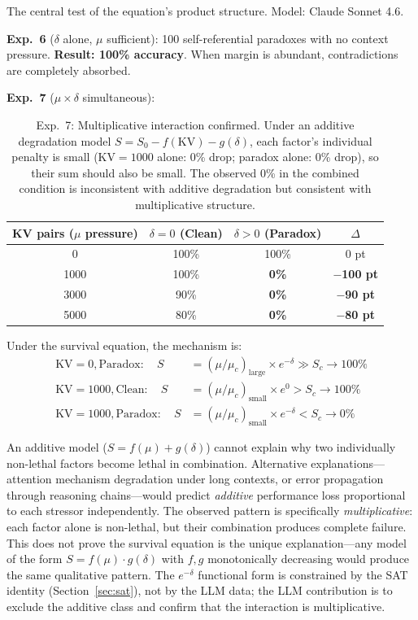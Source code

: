 \documentclass[11pt,a4paper]{article}
\begin{document}
The central test of the equation's product structure. Model: Claude Sonnet 4.6.

\textbf{Exp.~6} ($\delta$ alone, $\mu$ sufficient): 100 self-referential paradoxes with no context pressure. \textbf{Result: 100\% accuracy}. When margin is abundant, contradictions are completely absorbed.

\textbf{Exp.~7} ($\mu \times \delta$ simultaneous):

\begin{table}[htbp]
\centering
\begin{tabular}{cccc}
\toprule
\textbf{KV pairs ($\mu$ pressure)} & \textbf{$\delta = 0$ (Clean)} & \textbf{$\delta > 0$ (Paradox)} & \textbf{$\Delta$} \\
\midrule
0 & 100\% & 100\% & 0 pt \\
1000 & 100\% & \textbf{0\%} & \textbf{$-$100 pt} \\
3000 & 90\% & \textbf{0\%} & \textbf{$-$90 pt} \\
5000 & 80\% & \textbf{0\%} & \textbf{$-$80 pt} \\
\bottomrule
\end{tabular}
\caption{Exp.~7: Multiplicative interaction confirmed. Under an additive degradation model $S = S_0 - f(\text{KV}) - g(\delta)$, each factor's individual penalty is small (KV$=1000$ alone: 0\% drop; paradox alone: 0\% drop), so their sum should also be small. The observed 0\% in the combined condition is inconsistent with additive degradation but consistent with multiplicative structure.}
\label{tab:exp7}
\end{table}

Under the survival equation, the mechanism is:
\begin{align*}
\text{KV}=0, \text{Paradox}: \quad S &= (\mu/\mu_c)_{\text{large}} \times e^{-\delta} \gg S_c \to 100\% \\
\text{KV}=1000, \text{Clean}: \quad S &= (\mu/\mu_c)_{\text{small}} \times e^{0} > S_c \to 100\% \\
\text{KV}=1000, \text{Paradox}: \quad S &= (\mu/\mu_c)_{\text{small}} \times e^{-\delta} < S_c \to 0\%
\end{align*}

An additive model ($S = f(\mu) + g(\delta)$) cannot explain why two individually non-lethal factors become lethal in combination. Alternative explanations---attention mechanism degradation under long contexts, or error propagation through reasoning chains---would predict \emph{additive} performance loss proportional to each stressor independently. The observed pattern is specifically \emph{multiplicative}: each factor alone is non-lethal, but their combination produces complete failure. This does not prove the survival equation is the unique explanation---any model of the form $S = f(\mu) \cdot g(\delta)$ with $f, g$ monotonically decreasing would produce the same qualitative pattern. The $e^{-\delta}$ functional form is constrained by the SAT identity (Section~\ref{sec:sat}), not by the LLM data; the LLM contribution is to exclude the additive class and confirm that the interaction is multiplicative.
\end{document}
